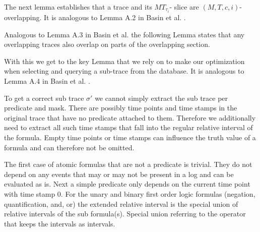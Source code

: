 The next lemma establishes that a trace and its $MT_{\tau_i}$- slice are $(M,T,c,i)$- overlapping.
It is analogous to Lemma A.2 in Basin et al. \cite{Basin2016}.




Analogous to Lemma A.3 in Basin et al. \cite{Basin2016} the following Lemma states that any overlapping traces also overlap on parts of the overlapping section.



With this we get to the key Lemma that we rely on to make our optimization when selecting and querying a sub-trace from the database.
It is analogous to Lemma A.4 in Basin et al. \cite{Basin2016}.





To get a correct sub trace $\sigma'$ we cannot simply extract the sub trace per predicate and mask.
There are possibly time points and time stamps in the original trace that have no predicate attached to them.
Therefore we additionally need to extract all such time stamps that fall into the regular relative interval of the formula.
Empty time points or time stamps can influence the truth value of a formula and can therefore not be omitted.

The first case of atomic formulas that are not a predicate is trivial.
They do not depend on any events that may or may not be present in a log and can be evaluated as is.
Next a simple predicate only depends on the current time point with time stamp $0$.
For the unary and binary first order logic formulas (negation, quantification, and, or) the extended relative interval is the special union of relative intervals of the sub formula(s).
Special union referring to the operator that keeps the intervals as intervals.
